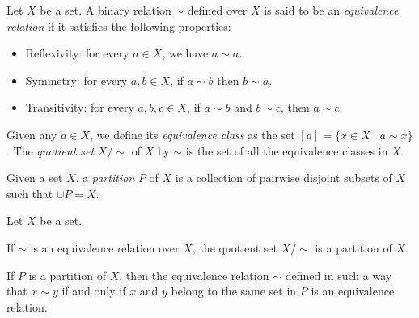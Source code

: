 \begin{definition}
Let $X$ be a set. A binary relation $\sim$ defined over $X$ is said to be an \emph{equivalence relation} if it satisfies the following properties:
\begin{itemize}
\item Reflexivity: for every $a\in X$, we have $a\sim a$.
\item Symmetry: for every $a,b \in X$, if $a\sim b$ then $b\sim a$.
\item Transitivity: for every $a,b,c\in X$, if $a\sim b$ and $b\sim c$, then $a\sim c$.
\end{itemize}
Given any $a\in X$, we define its \emph{equivalence class} as the set $[a] = \{x\in X \mid a\sim x\}$.
The \emph{quotient set} $X/{\sim}$ of $X$ by $\sim$ is the set of all the equivalence classes in $X$.
\label{<+label+>}
\end{definition}

\begin{definition}
Given a set $X$, a \emph{partition} $P$ of $X$ is a collection of pairwise disjoint subsets of $X$ such that $\cup P = X$. 
\end{definition}

\begin{proposition}
Let $X$ be a set.
\begin{statements}
\item If $\sim$ is an equivalence relation over $X$, the quotient set $X/\sim$ is a partition of $X$. 
\item If $P$ is a partition of $X$, then the equivalence relation $\sim$ defined in such a way that $x\sim y$ if and only if $x$ and $y$ belong to the same set in $P$ is an equivalence relation. 
\end{statements}
\end{proposition}


